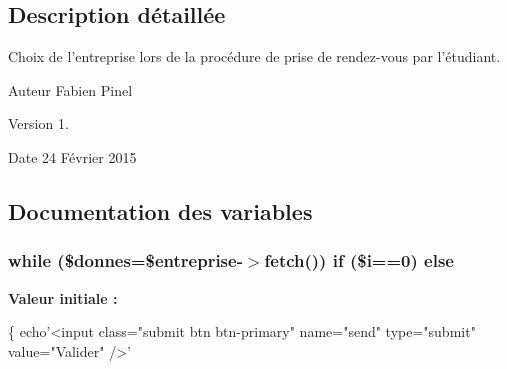 \subsection{Description détaillée}
Choix de l'entreprise lors de la procédure de prise de rendez-\/vous par l'étudiant. \begin{DoxyAuthor}{Auteur}
Fabien Pinel 
\end{DoxyAuthor}
\begin{DoxyVersion}{Version}
1. 
\end{DoxyVersion}
\begin{DoxyDate}{Date}
24 Février 2015 
\end{DoxyDate}


\subsection{Documentation des variables}
\hypertarget{rdv_8php_af36a3114d024cefc6470a45e7847dc51}{
\subsubsection[{else}]{\setlength{\rightskip}{0pt plus 5cm}while (\$donnes=\$entreprise-\/$>$fetch()) if (\$i==0) else}}\label{rdv_8php_af36a3114d024cefc6470a45e7847dc51}
{\bfseries Valeur initiale \-:}
\begin{DoxyCode}
\{
        echo\textcolor{stringliteral}{'<input class="submit btn btn-primary" name="send" type="submit" value="Valider" />'}
\end{DoxyCode}
